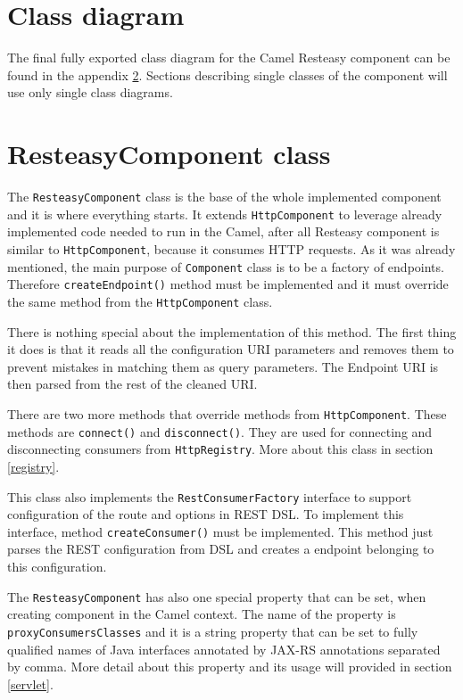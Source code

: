 \documentclass[12pt,final,oneside]{fithesis2}
\begin{document}
\section{Class diagram}
The final fully exported class diagram for the Camel Resteasy component can be found in the appendix \ref{}. Sections describing single classes of the component will use only single class diagrams.

\section{ResteasyComponent class}
The \texttt{ResteasyComponent} class is the base of the whole implemented component and it is where everything starts. It extends \texttt{HttpComponent} to leverage already implemented code needed to run in the Camel, after all Resteasy component is similar to \texttt{HttpComponent}, because it consumes HTTP requests. As it was already mentioned, the main purpose of \texttt{Component} class is to be a factory of endpoints. Therefore \texttt{createEndpoint()} method must be implemented and it must override the same method from the \texttt{HttpComponent} class.

There is nothing special about the implementation of this method. The first thing it does is that it reads all the configuration URI parameters and removes them to prevent mistakes in matching them as query parameters. The Endpoint URI is then parsed from the rest of the cleaned URI.

There are two more methods that override methods from \texttt{HttpComponent}. These methods are \texttt{connect()} and \texttt{disconnect()}. They are used for connecting and disconnecting consumers from \texttt{HttpRegistry}. More about this class in section \ref{registry}. 

This class also implements the \texttt{RestConsumerFactory} interface to support configuration of the route and options in REST DSL. To implement this interface, method \texttt{createConsumer()} must be implemented. This method just parses the REST configuration from DSL and creates a endpoint belonging to this configuration.

The \texttt{ResteasyComponent} has also one special property that can be set, when creating component in the Camel context. The name of  the property is \texttt{proxyConsumersClasses} and it is a string property that can be set to fully qualified names of Java interfaces annotated by JAX-RS annotations separated by comma. More detail about this property and its usage will provided in section \ref{servlet}.
\end{document}
